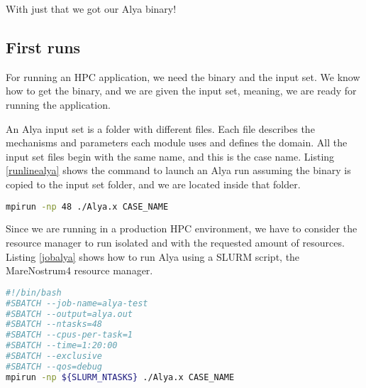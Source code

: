 With just that we got our Alya binary!

\subsection{First runs}

For running an HPC application, we need the binary and the input set. We know how to get the binary, and we are given the input set, meaning, we are ready for running the application.

An Alya input set is a folder with different files. Each file describes the mechanisms and parameters each module uses and defines the domain. All the input set files begin with the same name, and this is the case name. Listing \ref{runlinealya} shows the command to launch an Alya run assuming the binary is copied to the input set folder, and we are located inside that folder.

\begin{lstlisting}[language=sh, caption={Running Alya with 48 processes.}, label={runlinealya}]
mpirun -np 48 ./Alya.x CASE_NAME
\end{lstlisting}


Since we are running in a production HPC environment, we have to consider the resource manager to run isolated and with the requested amount of resources. Listing \ref{jobalya} shows how to run Alya using a SLURM script, the MareNostrum4 resource manager.

\begin{lstlisting}[language=sh, caption={Running Alya with 48 processes.}, label={jobalya}]
#!/bin/bash
#SBATCH --job-name=alya-test
#SBATCH --output=alya.out
#SBATCH --ntasks=48
#SBATCH --cpus-per-task=1
#SBATCH --time=1:20:00
#SBATCH --exclusive
#SBATCH --qos=debug
mpirun -np ${SLURM_NTASKS} ./Alya.x CASE_NAME
\end{lstlisting}

